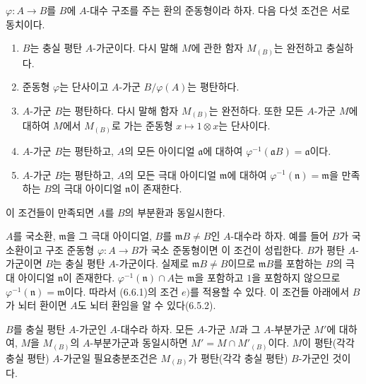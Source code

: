 \begin{env}[6.6.1]
\label{0.6.6.1-ko}
$\varphi:A\to B$를 $B$에 $A$-대수 구조를 주는 환의 준동형이라
하자. 다음 다섯 조건은 서로 동치이다.
\begin{enumerate}
  \item[$a)$] $B$는 충실 평탄 $A$-가군이다. 다시 말해 $M$에 관한
    함자 $M_{(B)}$는 완전하고 충실하다.
  \item[$b)$] 준동형 $\varphi$는 단사이고 $A$-가군
    $B/\varphi(A)$는 평탄하다.


  \item[$c)$] $A$-가군 $B$는 평탄하다. 다시 말해 함자 $M_{(B)}$는
    완전하다. 또한 모든 $A$-가군 $M$에 대하여 $M$에서
    $M_{(B)}$로 가는 준동형 $x\mapsto1\otimes x$는 단사이다.
  \item[$d)$] $A$-가군 $B$는 평탄하고, $A$의 모든 아이디얼
    $\mathfrak a$에 대하여
    $\varphi^{-1}(\mathfrak aB)=\mathfrak a$이다.
  \item[$e)$] $A$-가군 $B$는 평탄하고, $A$의 모든 극대 아이디얼
    $\mathfrak m$에 대하여
    $\varphi^{-1}(\mathfrak n)=\mathfrak m$을 만족하는 $B$의 극대
    아이디얼 $\mathfrak n$이 존재한다.
\end{enumerate}

이 조건들이 만족되면 $A$를 $B$의 부분환과 동일시한다.
\end{env}

\begin{env}[6.6.2]
\label{0.6.6.2-ko}
$A$를 국소환, $\mathfrak m$을 그 극대 아이디얼, $B$를
$\mathfrak mB\neq B$인 $A$-대수라 하자. 예를 들어 $B$가
국소환이고 구조 준동형 $\varphi:A\to B$가 국소 준동형이면 이
조건이 성립한다. $B$가 평탄 $A$-가군이면 $B$는 충실 평탄
$A$-가군이다. 실제로 $\mathfrak mB\neq B$이므로
$\mathfrak mB$를 포함하는 $B$의 극대 아이디얼 $\mathfrak n$이
존재한다. $\varphi^{-1}(\mathfrak n)\cap A$는 $\mathfrak m$을
포함하고 $1$을 포함하지 않으므로
$\varphi^{-1}(\mathfrak n)=\mathfrak m$이다. 따라서 (6.6.1)의
조건 $e)$를 적용할 수 있다. 이 조건들 아래에서 $B$가 뇌터 환이면
$A$도 뇌터 환임을 알 수 있다(6.5.2).
\end{env}

\begin{env}[6.6.3]
\label{0.6.6.3-ko}
$B$를 충실 평탄 $A$-가군인 $A$-대수라 하자. 모든 $A$-가군 $M$과
그 $A$-부분가군 $M'$에 대하여, $M$을 $M_{(B)}$의
$A$-부분가군과 동일시하면 $M'=M\cap M'_{(B)}$이다.
$M$이 평탄(각각 충실 평탄) $A$-가군일 필요충분조건은
$M_{(B)}$가 평탄(각각 충실 평탄) $B$-가군인 것이다.
\end{env}

